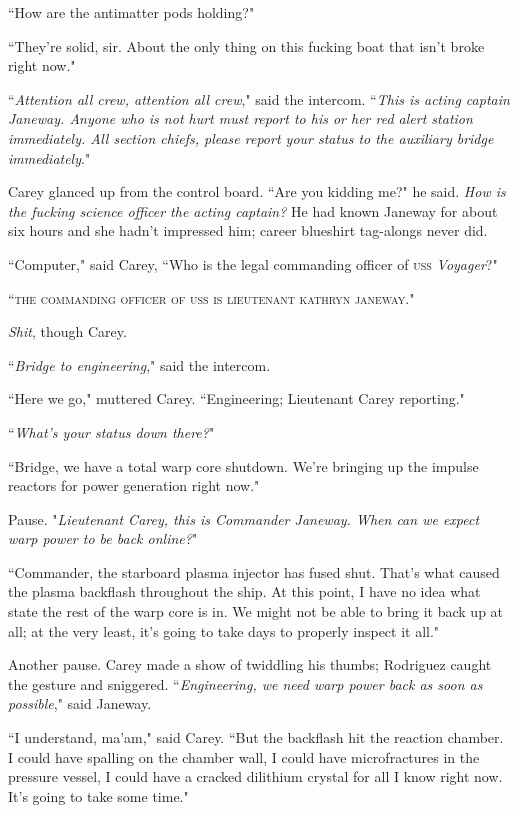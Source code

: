 \documentclass[twoside,letterpaper,12pt]{memoir}
\begin{document}
``How are the antimatter pods holding?"

``They're solid, sir. About the only thing on this fucking boat that isn't broke right now."

``\textit{Attention all crew, attention all crew}," said the intercom. ``\textit{This is acting captain Janeway. Anyone who is not hurt must report to his or her red alert station immediately. All section chiefs, please report your status to the auxiliary bridge immediately}."

Carey glanced up from the control board. ``Are you kidding me?" he said. \textit{How is the fucking science officer the acting captain?} He had known Janeway for about six hours and she hadn't impressed him; career blueshirt tag-alongs never did.

``Computer," said Carey, ``Who is the legal commanding officer of \textsc{uss} \textit{Voyager}?"

``\textsc{the commanding officer of uss}  \textsc{is lieutenant kathryn janeway}."

\textit{Shit}, though Carey.

``\textit{Bridge to engineering}," said the intercom.

``Here we go," muttered Carey. ``Engineering; Lieutenant Carey reporting."

``\textit{What's your status down there?}"

``Bridge, we have a total warp core shutdown. We're bringing up the impulse reactors for power generation right now."

Pause. "\textit{Lieutenant Carey, this is Commander Janeway. When can we expect warp power to be back online?}"

``Commander, the starboard plasma injector has fused shut. That's what caused the plasma backflash throughout the ship. At this point, I have no idea what state the rest of the warp core is in. We might not be able to bring it back up at all; at the very least, it's going to take days to properly inspect it all."

Another pause. Carey made a show of twiddling his thumbs; Rodriguez caught the gesture and sniggered. ``\textit{Engineering, we need warp power back as soon as possible}," said Janeway.

``I understand, ma'am," said Carey. ``But the backflash hit the reaction chamber. I could have spalling on the chamber wall, I could have microfractures in the pressure vessel, I could have a cracked dilithium crystal for all I know right now. It's going to take some time."
\end{document}
